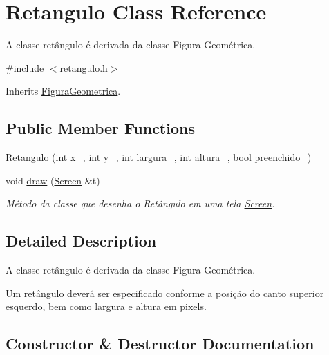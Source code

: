 \hypertarget{class_retangulo}{}\section{Retangulo Class Reference}
\label{class_retangulo}


A classe retângulo é derivada da classe Figura Geométrica.  




{\ttfamily \#include $<$retangulo.\+h$>$}



Inherits \hyperlink{class_figura_geometrica}{Figura\+Geometrica}.

\subsection*{Public Member Functions}
\begin{DoxyCompactItemize}
\item 
\hyperlink{class_retangulo_a26b7677c3f602098553099c47eba20e1}{Retangulo} (int x\+\_\+, int y\+\_\+, int largura\+\_\+, int altura\+\_\+, bool preenchido\+\_\+)
\item 
void \hyperlink{class_retangulo_ac088dd6d3f4f3d3f80363a868c2e74f1}{draw} (\hyperlink{class_screen}{Screen} \&t)
\begin{DoxyCompactList}\small\item\em Método da classe que desenha o Retângulo em uma tela \hyperlink{class_screen}{Screen}. \end{DoxyCompactList}\end{DoxyCompactItemize}


\subsection{Detailed Description}
A classe retângulo é derivada da classe Figura Geométrica. 

Um retângulo deverá ser especificado conforme a posição do canto superior esquerdo, bem como largura e altura em pixels. 

\subsection{Constructor \& Destructor Documentation}
\mbox{\label{class_retangulo_a26b7677c3f602098553099c47eba20e1}} 
